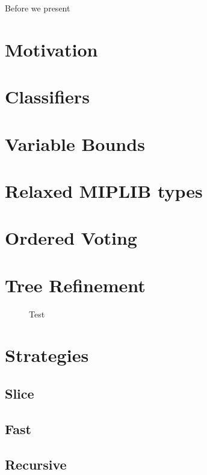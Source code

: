 	Before we present 
	
	\section{Motivation}
	
	\section{Classifiers}
	
		\section{Variable Bounds}
		
		\section{Relaxed MIPLIB types}
			
		\section{Ordered Voting}
		
	\section{Tree Refinement}
	
		\begin{figure}[ht!]
			\centering
			
			\caption{Test}
			\label{fig:tree:binpackNOP}
		\end{figure}
		
	\section{Strategies}
	
		\subsection{Slice}
		
		\subsection{Fast}
		
		\subsection{Recursive}
		

